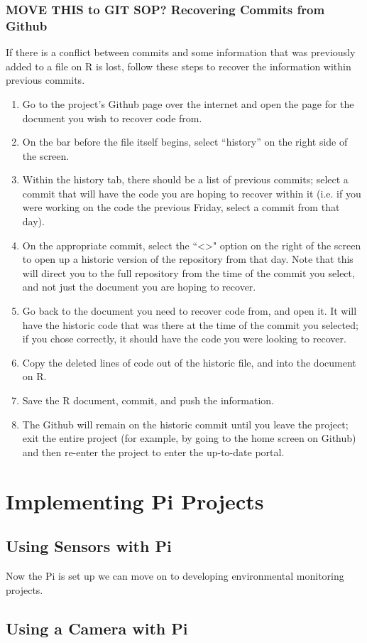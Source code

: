 \documentclass{article}\usepackage[]{graphicx}\usepackage[]{color}
\begin{document}
\subsubsection{MOVE THIS to GIT SOP? Recovering Commits from Github}


If there is a conflict between commits and some information that was previously added to a file on R is lost, follow these steps to recover the information within previous commits.

\begin{enumerate}

\item Go to the project's Github page over the internet and open the page for the document you wish to recover code from.

\item On the bar before the file itself begins, select ``history'' on the right side of the screen.

\item Within the history tab, there should be a list of previous commits; select a commit that will have the code you are hoping to recover within it (i.e. if you were working on the code the previous Friday, select a commit from that day).

\item On the appropriate commit, select the ``<>" option on the right of the screen to open up a historic version of the repository from that day.  Note that this will direct you to the full repository from the time of the commit you select, and not just the document you are hoping to recover.

\item Go back to the document you need to recover code from, and open it.  It will have the historic code that was there at the time of the commit you selected; if you chose correctly, it should have the code you were looking to recover.

\item Copy the deleted lines of code out of the historic file, and into the document on R. 

\item Save the R document, commit, and push the information.  

\item The Github will remain on the historic commit until you leave the project; exit the entire project (for example, by going to the home screen on Github) and then re-enter the project to enter the up-to-date portal.

\end{enumerate}


\section{Implementing Pi Projects}

\subsection{Using Sensors with Pi}

Now the Pi is set up we can move on to developing environmental monitoring projects. 
\subsection{Using a Camera with Pi}
\end{document}
